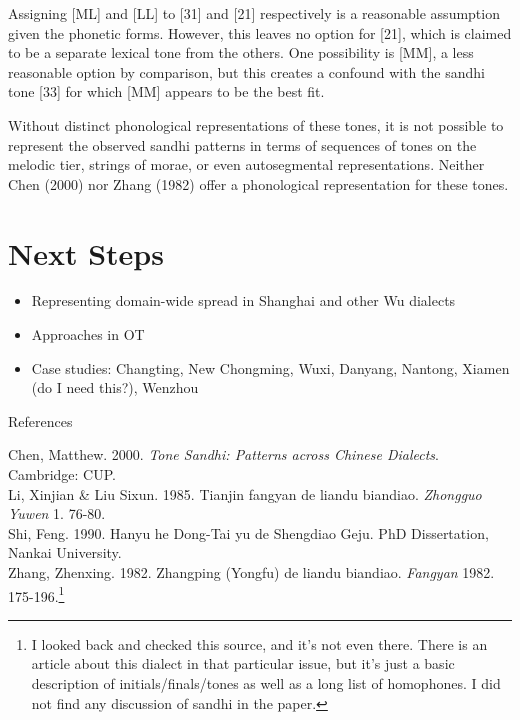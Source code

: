 \documentclass{article}
\begin{document}
Assigning [ML] and [LL] to [31] and [21] respectively is a reasonable assumption given the phonetic forms. However, this leaves no option for [21], which is claimed to be a separate lexical tone from the others. One possibility is [MM], a less reasonable option by comparison, but this creates a confound with the sandhi tone [33] for which [MM] appears to be the best fit. \par
Without distinct phonological representations of these tones, it is not possible to represent the observed sandhi patterns in terms of sequences of tones on the melodic tier, strings of morae, or even autosegmental representations. Neither Chen (2000) nor Zhang (1982) offer a phonological representation for these tones.
\section{Next Steps}
\begin{itemize}
	\item Representing domain-wide spread in Shanghai and other Wu dialects
	\item Approaches in OT
	\item Case studies: Changting, New Chongming, Wuxi, Danyang, Nantong, Xiamen (do I need this?), Wenzhou
\end{itemize}
\newpage
\begin{center}
References
\end{center}
Chen, Matthew. 2000. \textit{Tone Sandhi: Patterns across Chinese Dialects}. Cambridge: CUP. \\
Li, Xinjian \& Liu Sixun. 1985. Tianjin fangyan de liandu biandiao. \textit{Zhongguo Yuwen} 1. 76-80. \\
Shi, Feng. 1990. Hanyu he Dong-Tai yu de Shengdiao Geju. PhD Dissertation, Nankai University. \\
Zhang, Zhenxing. 1982. Zhangping (Yongfu) de liandu biandiao. \textit{Fangyan} 1982. 175-196.\footnote{I looked back and checked this source, and it's not even there. There is an article about this dialect in that particular issue, but it's just a basic description of initials/finals/tones as well as a long list of homophones. I did not find any discussion of sandhi in the paper.}
\end{document}

